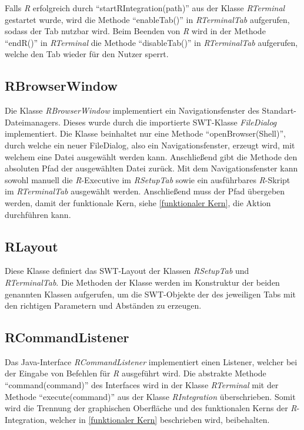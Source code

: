 \documentclass[a4paper, 12pt]{report} %
\begin{document}
Falls \textit{R} erfolgreich durch "`startRIntegration(path)"' aus der Klasse \textit{RTerminal} gestartet wurde, wird die Methode "`enableTab()"' in \textit{RTerminalTab} aufgerufen, sodass der Tab nutzbar wird. Beim Beenden von \textit{R} wird in der Methode "`endR()"' in  \textit{RTerminal} die Methode "`disableTab()"' in \textit{RTerminalTab} aufgerufen, welche den Tab wieder für den Nutzer sperrt.

\subsection{RBrowserWindow} \label{RBrowserWindow} 

Die Klasse \textit{RBrowserWindow} implementiert ein Navigationsfenster des Standart-Dateimanagers. 
Dieses wurde durch die importierte SWT-Klasse \textit{FileDialog} implementiert. Die Klasse beinhaltet nur eine Methode "`openBrowser(Shell)"', durch welche ein neuer FileDialog, also ein Navigationsfenster, erzeugt wird, mit welchem eine Datei ausgewählt werden kann. Anschließend gibt die Methode den absoluten Pfad der ausgewählten Datei zurück. 
Mit dem Navigationsfenster kann sowohl manuell die \textit{R}-Executive im \textit{RSetupTab} sowie ein ausführbares \textit{R}-Skript im \textit{RTerminalTab} ausgewählt werden. Anschließend muss der Pfad übergeben werden, damit der funktionale Kern, siehe \ref{funktionaler Kern}, die Aktion durchführen kann.

\subsection{RLayout}

Diese Klasse definiert das SWT-Layout der Klassen \textit{RSetupTab} und \textit{RTerminalTab}. 
Die Methoden der Klasse werden im Konstruktur der beiden genannten Klassen aufgerufen, um die SWT-Objekte der des jeweiligen Tabs mit den richtigen Parametern und Abständen zu erzeugen.

\subsection{RCommandListener} \label{RCommandListener}

Das Java-Interface \textit{RCommandListener} implementiert einen Listener, welcher bei der Eingabe von Befehlen für \textit{R} ausgeführt wird. Die abstrakte Methode "`command(command)"' des Interfaces wird in der Klasse \textit{RTerminal} mit der Methode "`execute(command)"' aus der Klasse \textit{RIntegration} überschrieben. Somit wird die Trennung der graphischen Oberfläche und des funktionalen Kerns der \textit{R}-Integration, welcher in \ref{funktionaler Kern} beschrieben wird, beibehalten.
\end{document}
